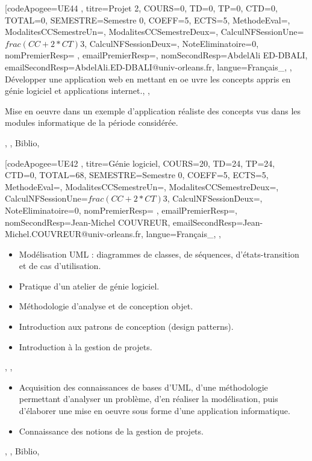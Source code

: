 \vfill


\module[codeApogee={UE44 },
titre={Projet 2},
COURS={0},
TD={0},
TP={0},
CTD={0},
TOTAL={0},
SEMESTRE={Semestre 0},
COEFF={5},
ECTS={5},
MethodeEval={},
ModalitesCCSemestreUn={},
ModalitesCCSemestreDeux={},
CalculNFSessionUne={$frac{(CC+2*CT)}{3}$},
CalculNFSessionDeux={},
NoteEliminatoire={0},
nomPremierResp={ },
emailPremierResp={},
nomSecondResp={AbdelAli ED-DBALI},
emailSecondResp={AbdelAli.ED-DBALI@univ-orleans.fr},
langue={Français_},
{},
{Développer une application web en mettant en oe uvre les concepts appris en génie logiciel et applications internet.},
{},
{\begin{itemize}
\ObjItem Mise en oeuvre dans un exemple d'application réaliste des concepts vus dans les modules informatique de la période considérée.
\end{itemize}},
{},
{Biblio},

\vfill


\module[codeApogee={UE42 },
titre={Génie logiciel},
COURS={20},
TD={24},
TP={24},
CTD={0},
TOTAL={68},
SEMESTRE={Semestre 0},
COEFF={5},
ECTS={5},
MethodeEval={},
ModalitesCCSemestreUn={},
ModalitesCCSemestreDeux={},
CalculNFSessionUne={$frac{(CC+2*CT)}{3}$},
CalculNFSessionDeux={},
NoteEliminatoire={0},
nomPremierResp={ },
emailPremierResp={},
nomSecondResp={Jean-Michel COUVREUR},
emailSecondResp={Jean-Michel.COUVREUR@univ-orleans.fr},
langue={Français_},
{},
{\begin{itemize}
\item Modélisation UML : diagrammes de classes, de séquences, d'états-transition et de cas d'utilisation.
  \item Pratique d'un atelier de génie logiciel.
  \item Méthodologie d'analyse et de conception objet.
  \item Introduction aux patrons de conception (design patterns).
  \item Introduction à la gestion de projets.
\end{itemize}},
{},
{\begin{itemize}
\item Acquisition des connaissances de bases d'UML, d'une méthodologie permettant d'analyser un problème, d'en réaliser la modélisation, puis d'élaborer une mise en oeuvre sous forme d'une application informatique. 
  \item Connaissance des notions de la gestion de projets.
\end{itemize}},
{},
{Biblio},

